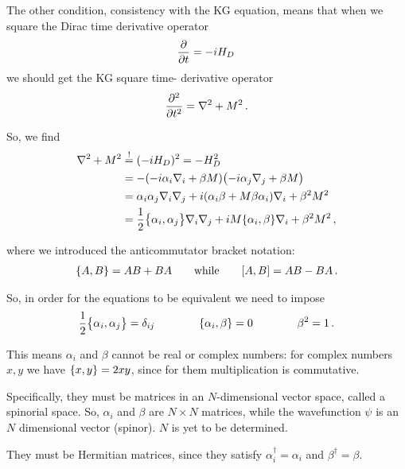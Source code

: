 \documentclass[main.tex]{subfiles}
\begin{document}
The other condition, consistency with the KG equation, means that when we square the Dirac time derivative operator 
%
\begin{align}
\pdv{}{t} = -i H_D
\,
\end{align}
%
we should get the KG square time- derivative operator 
%
\begin{align}
\pdv[2]{}{t} = \nabla^2 + M^2
\,.
\end{align}

So, we find 
%
\begin{subequations}
\begin{align}
\nabla^2 + M^2 &\overset{!}{=} (-i H_D)^2 = - H_D^2  \\
&= -\qty(-i \alpha_{i}  \nabla_{i} + \beta M) \qty(-i \alpha_{j} \nabla_{j} + \beta M)  \\
&= \alpha_{i} \alpha_{j} \nabla_{i} \nabla_{j} + i \qty(\alpha_{i} \beta  + M \beta \alpha_{i}) \nabla_{i} + \beta^2 M^2 \\
&= \frac{1}{2} \qty{\alpha_{i}, \alpha_{j}} \nabla_{i} \nabla_{j} 
+ iM \qty{\alpha_{i}, \beta } \nabla_{i} + \beta^2M^2
\,,
\end{align}
\end{subequations}
%

where we introduced the anticommutator bracket notation: 
%
\begin{align}
\qty{A, B} = AB + BA
\qquad \text{while} \qquad
\qty[A, B] = AB - BA
\,.
\end{align}

So, in order for the equations to be equivalent we need to impose 
%
\begin{align}
\frac{1}{2}\qty{\alpha_{i}, \alpha_{j}} = \delta_{ij}
\qquad \qquad 
\qty{\alpha_{i}, \beta } = 0
\qquad \qquad 
\beta^2 = 1
\,.
\end{align}

This means \(\alpha_{i}\) and \(\beta \) cannot be real or complex numbers: for complex numbers \(x, y\) we have \(\qty{x, y} = 2 xy \),  since for them multiplication is commutative. 

Specifically, they must be matrices in an \(N\)-dimensional vector space, called a spinorial space. 
So, \(\alpha_{i}\) and \(\beta \) are \(N \times N\) matrices, while the wavefunction \(\psi \) is an \(N\) dimensional vector (spinor). \(N\) is yet to be determined.

They must be Hermitian matrices, since they satisfy \(\alpha_{i} ^\dag = \alpha_{i}\) and \(\beta ^\dag = \beta \).
\end{document}

